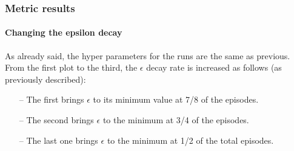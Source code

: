 \documentclass{article}
\begin{document}
\subsubsection{Metric results}

\paragraph{Changing the epsilon decay}

As already said, the hyper parameters for the runs are the same as previous.
\\
From the first plot to the third, the $\epsilon$ decay rate is increased as follows (as previously described):
\begin{itemize}
\item[--] The first brings $\epsilon$ to its minimum value at 7/8 of the episodes.
\item[--] The second brings $\epsilon$ to the minimum at 3/4 of the episodes.
\item[--] The last one brings $\epsilon$ to the minimum at 1/2 of the total episodes.
\end{itemize}

\begin{center}
\centering
{}
\end{center}


\begin{center}
\centering
{}
\end{center}
\end{document}
